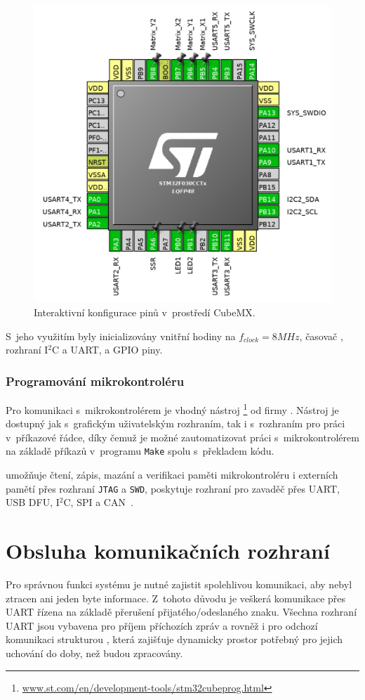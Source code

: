         \begin{figure}[h]
            \centering
            \includegraphics[width=0.8\linewidth]{obrazky-figures/cubemx.pdf}
            \caption{Interaktivní konfigurace pinů v~prostředí CubeMX.}
            \label{img:cubemx}
        \end{figure}

        S~jeho využitím byly inicializovány vnitřní hodiny na $f_{clock}=8\unit{MHz}$, časovač , rozhraní I$^2$C a UART, a GPIO piny.

        \subsubsection{Programování mikrokontroléru}
            Pro komunikaci s~mikrokontrolérem je vhodný nástroj \footnote{\url{www.st.com/en/development-tools/stm32cubeprog.html}} od firmy . Nástroj je dostupný jak s~grafickým uživatelským rozhraním, tak i s~rozhraním pro práci v~příkazové řádce, díky čemuž je možné zautomatizovat práci s~mikrokontrolérem na základě příkazů v~programu \texttt{Make} spolu s~překladem kódu. 
            
             umožňuje čtení, zápis, mazání a verifikaci paměti mikrokontroléru i externích pamětí přes rozhraní \texttt{JTAG} a \texttt{SWD}, poskytuje rozhraní pro zavaděč přes UART, USB DFU, I$^2$C, SPI a CAN~\cite{stm:cubeprog}. 

    \section{Obsluha komunikačních rozhraní}
        Pro správnou funkci systému je nutné zajistit spolehlivou komunikaci, aby nebyl ztracen ani jeden byte informace. Z~tohoto důvodu je veškerá komunikace přes UART řízena na základě přerušení přijatého/odeslaného znaku. Všechna rozhraní UART jsou vybavena pro příjem příchozích zpráv a rovněž i pro odchozí komunikaci strukturou , která zajišťuje dynamicky prostor potřebný pro jejich uchování do doby, než budou zpracovány. 

